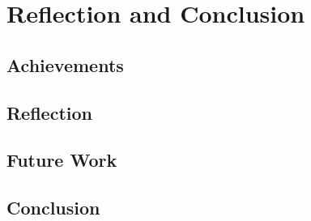 \chapter{Reflection and Conclusion}
\label{chap:conclusion}

\section{Achievements}

\section{Reflection}

\section{Future Work}

\section{Conclusion}

